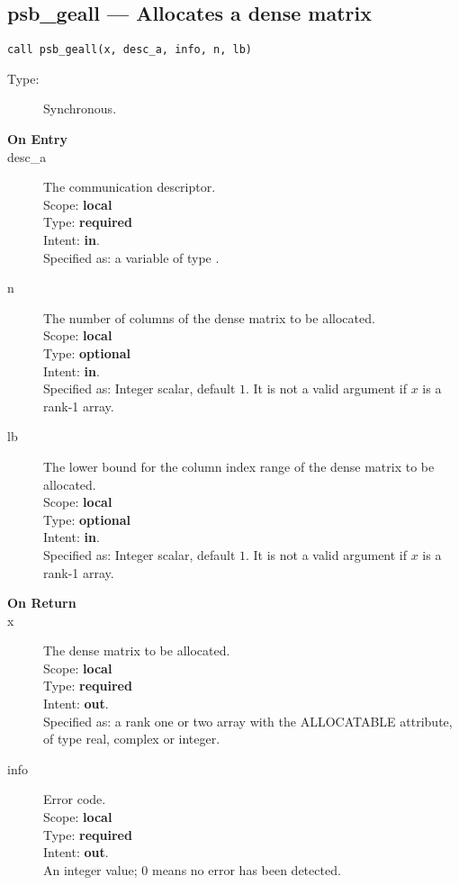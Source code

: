 %
%
\clearpage\subsection*{psb\_geall --- Allocates a dense matrix}

\begin{verbatim}
call psb_geall(x, desc_a, info, n, lb)
\end{verbatim}

\begin{description}
\item[Type:] Synchronous.
\item[\bf On Entry]
\item[desc\_a] The communication descriptor.\\
Scope: {\bf local} \\
Type: {\bf required}\\
Intent: {\bf in}.\\
Specified as: a variable of type \descdata.\\
\item[n] The number of columns of the dense matrix to be allocated.\\
Scope: {\bf local} \\
Type: {\bf optional}\\
Intent: {\bf in}.\\
Specified as: Integer scalar, default $1$. It is not a valid argument  if $x$ is a
rank-1 array. 
\item[lb] The lower bound for the column index range of the dense matrix to be allocated.\\
Scope: {\bf local} \\
Type: {\bf optional}\\
Intent: {\bf in}.\\
Specified as: Integer scalar, default $1$. It is not a valid argument if $x$ is a
rank-1 array. 
\end{description}

\begin{description}
\item[\bf On Return]
\item[x] The dense matrix to be allocated.\\
Scope: {\bf local} \\
Type: {\bf required}\\
Intent: {\bf out}.\\
Specified as: a rank one or two array with the ALLOCATABLE
attribute, of type real, complex or integer.\\
\item[info] Error code.\\
Scope: {\bf local} \\
Type: {\bf required} \\
Intent: {\bf out}.\\
An integer value; 0 means no error has been detected. 
\end{description}


